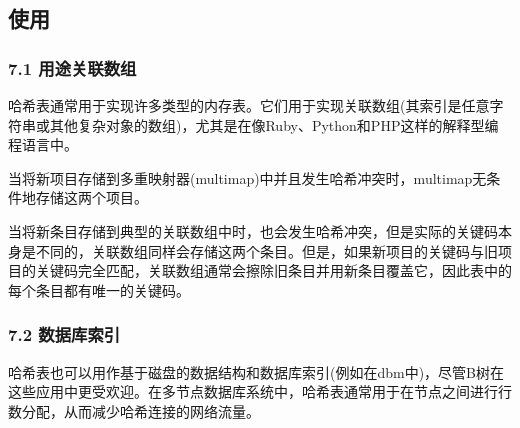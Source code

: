 \subsection{使用}
\subsubsection{7.1 用途关联数组}
哈希表通常用于实现许多类型的内存表。它们用于实现关联数组(其索引是任意字符串或其他复杂对象的数组)，尤其是在像Ruby、Python和PHP这样的解释型编程语言中。

当将新项目存储到多重映射器(multimap)中并且发生哈希冲突时，multimap无条件地存储这两个项目。

当将新条目存储到典型的关联数组中时，也会发生哈希冲突，但是实际的关键码本身是不同的，关联数组同样会存储这两个条目。但是，如果新项目的关键码与旧项目的关键码完全匹配，关联数组通常会擦除旧条目并用新条目覆盖它，因此表中的每个条目都有唯一的关键码。
\subsubsection{7.2 数据库索引}
哈希表也可以用作基于磁盘的数据结构和数据库索引(例如在dbm中)，尽管B树在这些应用中更受欢迎。在多节点数据库系统中，哈希表通常用于在节点之间进行行数分配，从而减少哈希连接的网络流量。
\subsubsection{}